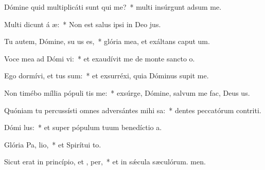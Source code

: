 \item Dómine quid multiplicáti sunt qui  me?~* multi insúrgunt adsum me.
\item Multi dicunt á æ:~* Non est salus ipsi in Deo jus.
\item Tu autem, Dómine, su us es,~* glória mea, et exáltans caput um.
\item Voce mea ad Dómi vi:~* et exaudívit me de monte sancto o.
\item Ego dormívi, et tus sum:~* et exsurréxi, quia Dóminus supit me.
\item Non timébo míllia pópuli tis me:~* exsúrge, Dómine, salvum me fac, Deus us.
\item Quóniam tu percussísti omnes adversántes mihi  sa:~* dentes peccatórum contriti.
\item Dómi  lus:~* et super pópulum tuum benedíctio a.
\item Glória Pa,  lio,~* et Spirítui to.
\item Sicut erat in princípio, et ,  per,~* et in sǽcula sæculórum. men.

